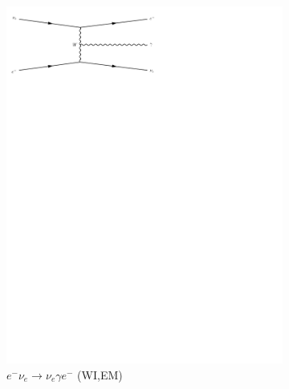 \begin{figure}[h]
\begin{subfigure}[b]{0.3\textwidth}
    \includegraphics[trim={0.5cm 22cm 10cm 0cm},width=\textwidth]{../Diagrams/D7.pdf}
    \caption{$e^-\nu_e\rightarrow \nu_e \gamma e^-$ (WI,EM)}
    \label{fey:7}
  \end{subfigure}%
  ~
  \begin{subfigure}[b]{0.3\textwidth}

\end{subfigure}
\end{figure}
